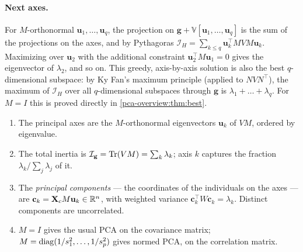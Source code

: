 \begin{notechapter}
\paragraph{Next axes.} For $M$-orthonormal $\mathbf u_1,\dots,\mathbf u_q$, the projection on
$\mathbf g + \mathbb V[\mathbf u_1,\dots,\mathbf u_q]$ is the sum of the projections on the axes, and by Pythagoras
$\mathcal I_H = \sum_{k\leq q}\mathbf u_k^\top MVM\mathbf u_k$. Maximizing over $\mathbf u_2$ with the additional constraint
$\mathbf u_2^\top M\mathbf u_1 = 0$ gives the eigenvector of $\lambda_2$, and so on. This greedy, axis-by-axis
solution is also the best $q$-dimensional subspace: by Ky Fan's maximum principle (applied to
$NVN^\top$), the maximum of $\mathcal I_H$ over all $q$-dimensional subspaces through $\mathbf g$ is
$\lambda_1 + \dots + \lambda_q$. For $M = I$ this is proved directly in \cref{pca-overview:thm:best}.

\begin{theorem}\label{pca-overview:thm:summary}
\begin{enumerate}
  \item The principal axes are the $M$-orthonormal eigenvectors $\mathbf u_k$ of $VM$, ordered by
        eigenvalue.
  \item The total inertia is $\mathcal I_{\mathbf g} = \operatorname{Tr}(VM) = \sum_k\lambda_k$; axis $k$ captures the
        fraction $\lambda_k/\sum_j\lambda_j$ of it.
  \item The \emph{principal components} --- the coordinates of the individuals on the axes ---
        are $\mathbf c_k = \mathbf X_cM\mathbf u_k\in\mathbb{R}^n$, with weighted variance $\mathbf c_k^\top W\mathbf c_k = \lambda_k$.
        Distinct components are uncorrelated.
  \item $M = I$ gives the usual PCA on the covariance matrix;
        $M = \operatorname{diag}(1/s_1^2,\dots,1/s_p^2)$ gives normed PCA, on the correlation matrix.
\end{enumerate}
\end{theorem}


\end{notechapter}
